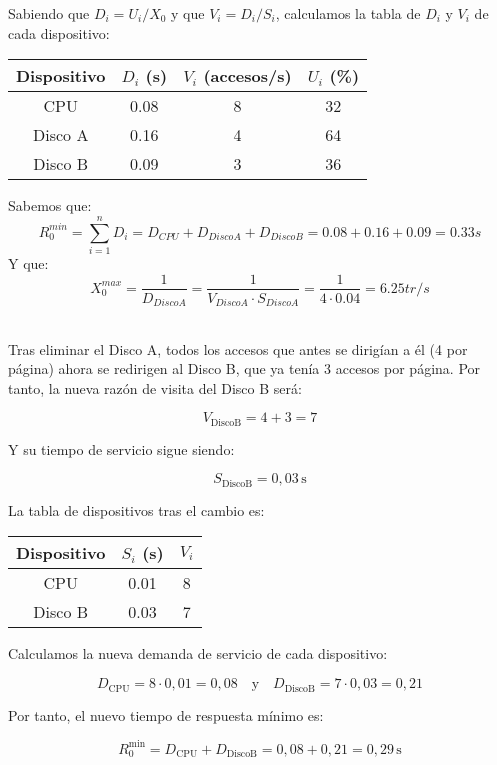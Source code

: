 \documentclass[a4paper,12pt]{article}
\begin{document}
\begin{enumerate}
    Sabiendo que $D_i = U_i / X_0$ y que $V_i = D_i/S_i$, calculamos la tabla de $D_i$ y $V_i$ de cada dispositivo:
    \begin{center}
    \begin{tabular}{|c|c|c|c|}
    \hline
    Dispositivo & $D_i$ (s) & $V_i$ (accesos/s) & $U_i$ (\%)\\
    \hline
    CPU & 0.08 & 8 & 32 \\
    Disco A & 0.16 & 4 & 64 \\
    Disco B & 0.09 & 3 & 36 \\
    \hline
    \end{tabular}
    \end{center}


    Sabemos que:
    $$
    R_0^{min} = \sum_{i=1}^{n} D_i = D_{CPU} + D_{DiscoA} + D_{DiscoB} =  0.08 + 0.16 + 0.09 = 0.33s
    $$
    Y que:
    $$
    X_0^{max} = \frac{1}{D_{DiscoA}} = \frac{1}{V_{DiscoA} \cdot S_{DiscoA}} = \frac{1}{4 \cdot 0.04} = 6.25 tr/s
    $$

     \\

Tras eliminar el Disco A, todos los accesos que antes se dirigían a él (4 por página) ahora se redirigen al Disco B, que ya tenía 3 accesos por página. Por tanto, la nueva razón de visita del Disco B será:

\[
V_{\text{DiscoB}} = 4 + 3 = 7
\]

Y su tiempo de servicio sigue siendo:

\[
S_{\text{DiscoB}} = 0{,}03 \, \text{s}
\]

La tabla de dispositivos tras el cambio es:

\begin{center}
\begin{tabular}{|c|c|c|}
\hline
Dispositivo & $S_i$ (s) & $V_i$ \\
\hline
CPU & 0.01 & 8 \\
Disco B & 0.03 & 7 \\
\hline
\end{tabular}
\end{center}

Calculamos la nueva demanda de servicio de cada dispositivo:

\[
D_{\text{CPU}} = 8 \cdot 0{,}01 = 0{,}08 \quad \text{y} \quad D_{\text{DiscoB}} = 7 \cdot 0{,}03 = 0{,}21
\]

Por tanto, el nuevo tiempo de respuesta mínimo es:

\[
R_0^{\text{min}} = D_{\text{CPU}} + D_{\text{DiscoB}} = 0{,}08 + 0{,}21 = \boxed{0{,}29 \, \text{s}}
\]


\end{enumerate}
\end{document}
